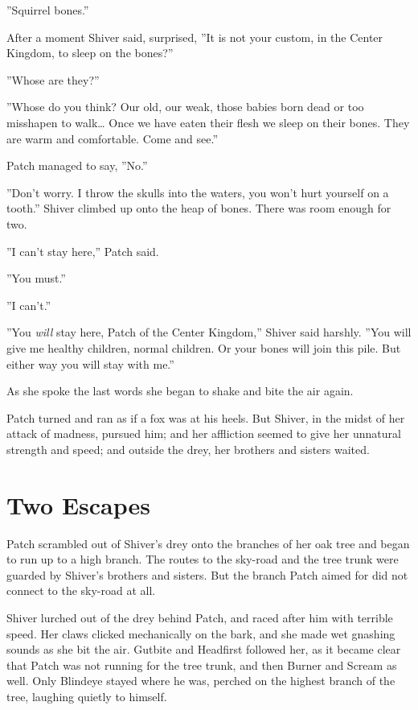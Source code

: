 \documentclass[12pt]{book}
\begin{document}
''Squirrel bones.''

After a moment Shiver said, surprised, ''It is not your custom, in the
Center Kingdom, to sleep on the bones?''

''Whose are they?''

''Whose do you think? Our old, our weak, those babies born dead or too
misshapen to walk\ldots{} Once we have eaten their flesh we sleep on
their bones. They are warm and comfortable. Come and see.''

Patch managed to say, ''No.''

''Don't worry. I throw the skulls into the waters, you won't hurt
yourself on a tooth.'' Shiver climbed up onto the heap of bones. There
was room enough for two.

''I can't stay here,'' Patch said.

''You must.''

''I can't.''

''You \textit{will} stay here, Patch of the Center Kingdom,'' Shiver
said harshly. ''You will give me healthy children, normal children. Or
your bones will join this pile. But either way you will stay with
me.''

As she spoke the last words she began to shake and bite the air again.

Patch turned and ran as if a fox was at his heels. But Shiver, in the
midst of her attack of madness, pursued him; and her affliction seemed
to give her unnatural strength and speed; and outside the drey, her
brothers and sisters waited.


\section{Two Escapes}

Patch scrambled out of Shiver's drey onto the branches of her oak tree
and began to run up to a high branch. The routes to the sky-road and
the tree trunk were guarded by Shiver's brothers and sisters. But the
branch Patch aimed for did not connect to the sky-road at all.

Shiver lurched out of the drey behind Patch, and raced after him with
terrible speed. Her claws clicked mechanically on the bark, and she
made wet gnashing sounds as she bit the air. Gutbite and Headfirst
followed her, as it became clear that Patch was not running for the
tree trunk, and then Burner and Scream as well. Only Blindeye stayed
where he was, perched on the highest branch of the tree, laughing
quietly to himself.
\end{document}
